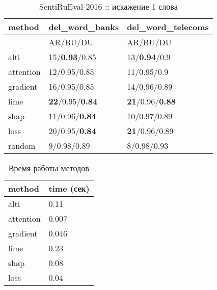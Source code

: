 \begin{table}[H]
  \centering
  \caption*{SentiRuEval-2016 :: искажение 1 слова}
  {\renewcommand{\arraystretch}{1.5}
  {\fontsize{11pt}{10pt}\selectfont
  \begin{tabularx}{0.6\textwidth}{|l|X|X|}
    \hline
     method    & del\_word\_banks & del\_word\_telecoms \\
    \hline
     & AR/BU/DU & AR/BU/DU \\
    \hline
     alti      & 15/\textbf{0.93}/0.85 & 13/\textbf{0.94}/0.9 \\
    \hline
     attention & 12/0.95/0.85 & 11/0.95/0.9 \\
    \hline
     gradient  & 16/0.95/0.85 & 14/0.96/0.89 \\
    \hline
     lime      & \textbf{22}/0.95/\textbf{0.84} & \textbf{21}/0.96/\textbf{0.88} \\
    \hline
     shap      & 11/0.96/\textbf{0.84} & 10/0.97/0.89 \\
    \hline
     loss      & 20/0.95/\textbf{0.84} & \textbf{21}/0.96/0.89 \\
    \hline
     random    & 9/0.98/0.89 & 8/0.98/0.93 \\
    \hline
    \end{tabularx}
    }
    }
\end{table}

\begin{table}[H]
  \centering
  \caption*{Время работы методов}
  {\renewcommand{\arraystretch}{1.5}
  {\fontsize{11pt}{10pt}\selectfont
  \begin{tabularx}{0.3\textwidth}{|l|X|}
    \hline
     method    & time (сек) \\
    \hline
     alti      & 0.11 \\
    \hline
     attention & 0.007 \\
    \hline
     gradient  & 0.046 \\
    \hline
     lime      & 0.23 \\
    \hline
     shap      & 0.08 \\
    \hline
     loss      & 0.04 \\
    \hline
    \end{tabularx}
    }
    }
\end{table}

